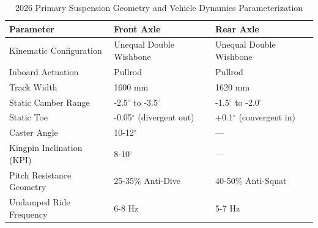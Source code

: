 \begin{table}[h]
\centering
\caption{2026 Primary Suspension Geometry and Vehicle Dynamics Parameterization}
\vspace{0.2cm}
\begin{tabularx}{\textwidth}{@{}lll@{}}
\toprule
\textbf{Parameter} & \textbf{Front Axle} & \textbf{Rear Axle} \\
\midrule
Kinematic Configuration & Unequal Double Wishbone & Unequal Double Wishbone \\
Inboard Actuation & Pullrod & Pullrod \\
Track Width & 1600 mm & 1620 mm \\
Static Camber Range & -2.5$^\circ$ to -3.5$^\circ$ & -1.5$^\circ$ to -2.0$^\circ$ \\
Static Toe & -0.05$^\circ$ (divergent out) & +0.1$^\circ$ (convergent in) \\
Caster Angle & 10-12$^\circ$ & --- \\
Kingpin Inclination (KPI) & 8-10$^\circ$ & --- \\
Pitch Resistance Geometry & 25-35\% Anti-Dive & 40-50\% Anti-Squat \\
Undamped Ride Frequency & 6-8 Hz & 5-7 Hz \\
\bottomrule
\end{tabularx}
\label{tab:suspension_geometry}
\end{table}
